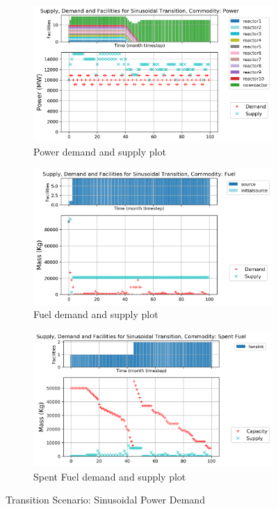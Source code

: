 \documentclass{anstrans}
\begin{document}
\begin{figure}[!htbp]
    \centering
    \begin{subfigure}[t]{\textwidth}
    \centering
        \includegraphics[width=0.9\linewidth]{figures/sinetransition-power.png} 
        \caption{Power demand and supply plot}
        \label{fig:sinetransition-power}
    \end{subfigure}
    \vspace{1cm}
    \begin{subfigure}[t]{0.45\textwidth}
        \centering
        \includegraphics[width=\linewidth]{figures/sinetransition-fuel.png} 
        \caption{Fuel demand and supply plot}
	    \label{fig:sinetransition-fuel}
    \end{subfigure}
    \hfill
    \begin{subfigure}[t]{0.45\textwidth}
        \centering
        \includegraphics[width=\linewidth]{figures/sinetransition-spentfuel.png} 
        \caption{Spent Fuel demand and supply plot}
        \label{fig:sinetransition-spentfuel}
    \end{subfigure}
    \caption{Transition Scenario: Sinusoidal Power Demand}
\end{figure}
\end{document}
